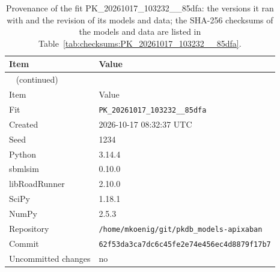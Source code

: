 \begin{longtable}{ll}
\caption{Provenance of the fit PK\_20261017\_103232\_\_85dfa: the versions it ran with and the revision of its models and data; the SHA-256 checksums of the models and data are listed in Table~\ref{tab:checksums:PK_20261017_103232__85dfa}.}\label{tab:provenance:PK_20261017_103232__85dfa} \\
\toprule
Item & Value \\
\midrule
\endfirsthead
\multicolumn{2}{l}{\small\tablename~\thetable{} (continued)} \\
\toprule
Item & Value \\
\midrule
\endhead
\bottomrule
\endlastfoot
Fit & \texttt{PK\_20261017\_103232\_\_85dfa} \\
Created & 2026-10-17 08:32:37 UTC \\
Seed & 1234 \\
Python & 3.14.4 \\
sbmlsim & 0.10.0 \\
libRoadRunner & 2.10.0 \\
SciPy & 1.18.1 \\
NumPy & 2.5.3 \\
Repository & \texttt{/home/mkoenig/git/pkdb\_models-apixaban} \\
Commit & \texttt{62f53da3ca7dc6c45fe2e74e456ec4d8879f17b7} \\
Uncommitted changes & no \\
\end{longtable}



